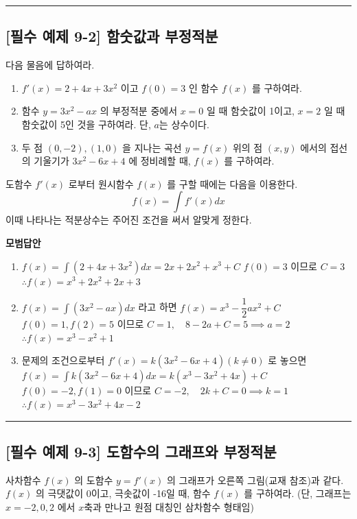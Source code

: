 \documentclass[a4paper,11pt]{article}
\begin{document}
\vspace{0.5cm}
\hrule
\vspace{0.5cm}

\subsection*{[필수 예제 9-2] 함숫값과 부정적분}
다음 물음에 답하여라.
\begin{enumerate}
    \item $f'(x)=2+4x+3x^2$ 이고 $f(0)=3$ 인 함수 $f(x)$ 를 구하여라.
    \item 함수 $y=3x^2-ax$ 의 부정적분 중에서 $x=0$ 일 때 함숫값이 1이고, $x=2$ 일 때 함숫값이 5인 것을 구하여라. 단, $a$는 상수이다.
    \item 두 점 $(0, -2), (1, 0)$ 을 지나는 곡선 $y=f(x)$ 위의 점 $(x, y)$ 에서의 접선의 기울기가 $3x^2-6x+4$ 에 정비례할 때, $f(x)$ 를 구하여라.
\end{enumerate}

\begin{studybox}
도함수 $f'(x)$ 로부터 원시함수 $f(x)$ 를 구할 때에는 다음을 이용한다.
\[ f(x) = \int f'(x) dx \]
이때 나타나는 적분상수는 주어진 조건을 써서 알맞게 정한다.
\end{studybox}

\textbf{모범답안}
\begin{enumerate}
    \item $f(x) = \int (2+4x+3x^2) dx = 2x + 2x^2 + x^3 + C$
    $f(0)=3$ 이므로 $C=3$
    $\therefore f(x) = x^3 + 2x^2 + 2x + 3$
    \item $f(x) = \int (3x^2-ax) dx$ 라고 하면 $f(x) = x^3 - \dfrac{1}{2}ax^2 + C$
    $f(0)=1, f(2)=5$ 이므로 $C=1, \quad 8-2a+C=5 \implies a=2$
    $\therefore f(x) = x^3 - x^2 + 1$
    \item 문제의 조건으로부터 $f'(x) = k(3x^2-6x+4) (k \ne 0)$ 로 놓으면
    $f(x) = \int k(3x^2-6x+4) dx = k(x^3-3x^2+4x) + C$
    $f(0)=-2, f(1)=0$ 이므로 $C=-2, \quad 2k+C=0 \implies k=1$
    $\therefore f(x) = x^3 - 3x^2 + 4x - 2$
\end{enumerate}

\vspace{0.5cm}
\hrule
\vspace{0.5cm}

\subsection*{[필수 예제 9-3] 도함수의 그래프와 부정적분}
사차함수 $f(x)$ 의 도함수 $y=f'(x)$ 의 그래프가 오른쪽 그림(교재 참조)과 같다. $f(x)$ 의 극댓값이 0이고, 극솟값이 -16일 때, 함수 $f(x)$ 를 구하여라.
(단, 그래프는 $x=-2, 0, 2$ 에서 $x$축과 만나고 원점 대칭인 삼차함수 형태임)
\end{document}
